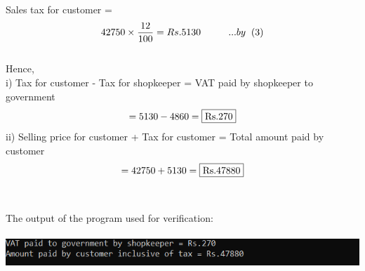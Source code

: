 \documentclass[12pt, twocolumn]{article}
\begin{document}
Sales tax for customer = \begin{equation*}\\
    42750\times\frac{12}{100} = Rs.5130 \hspace{1cm}... by \hspace{0.2cm} (3)\\
\end{equation*} \\
Hence,\\
i) Tax for customer - Tax for shopkeeper = 
    VAT paid by shopkeeper to government  \\
     \begin{equation*}
        = 5130 - 4860 = \fbox{Rs.270}\\
   \end{equation*}
ii) Selling price for customer + Tax for customer = Total amount paid by customer\\ 
    \begin{equation*}
       = 42750 + 5130 = \fbox{Rs.47880}\\
   \end{equation*} \\ \\
The output of the program used for verification:\\ \\
\includegraphics[scale=1.1]{codeoutput.png} \\
\end{document}
